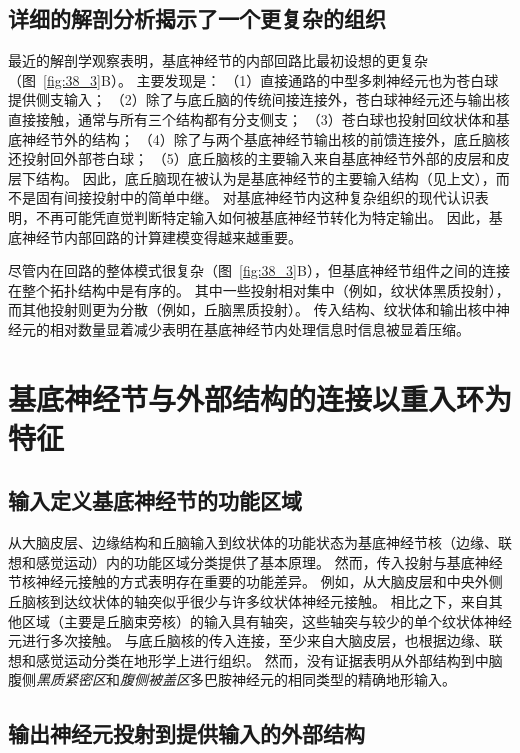 \subsection{详细的解剖分析揭示了一个更复杂的组织}

最近的解剖学观察表明，基底神经节的内部回路比最初设想的更复杂（图~\ref{fig:38_3}B）。
主要发现是：
（1）直接通路的中型多刺神经元也为苍白球提供侧支输入； 
（2）除了与底丘脑的传统间接连接外，苍白球神经元还与输出核直接接触，通常与所有三个结构都有分支侧支；
（3）苍白球也投射回纹状体和基底神经节外的结构；
（4）除了与两个基底神经节输出核的前馈连接外，底丘脑核还投射回外部苍白球； 
（5）底丘脑核的主要输入来自基底神经节外部的皮层和皮层下结构。
因此，底丘脑现在被认为是基底神经节的主要输入结构（见上文），而不是固有间接投射中的简单中继。
对基底神经节内这种复杂组织的现代认识表明，不再可能凭直觉判断特定输入如何被基底神经节转化为特定输出。
因此，基底神经节内部回路的计算建模变得越来越重要。


尽管内在回路的整体模式很复杂（图~\ref{fig:38_3}B），但基底神经节组件之间的连接在整个拓扑结构中是有序的。
其中一些投射相对集中（例如，纹状体黑质投射），而其他投射则更为分散（例如，丘脑黑质投射）。
传入结构、纹状体和输出核中神经元的相对数量显着减少表明在基底神经节内处理信息时信息被显着压缩。



\section{基底神经节与外部结构的连接以重入环为特征}

\subsection{输入定义基底神经节的功能区域}

从大脑皮层、边缘结构和丘脑输入到纹状体的功能状态为基底神经节核（边缘、联想和感觉运动）内的功能区域分类提供了基本原理。
然而，传入投射与基底神经节核神经元接触的方式表明存在重要的功能差异。
例如，从大脑皮层和中央外侧丘脑核到达纹状体的轴突似乎很少与许多纹状体神经元接触。
相比之下，来自其他区域（主要是丘脑束旁核）的输入具有轴突，这些轴突与较少的单个纹状体神经元进行多次接触。
与底丘脑核的传入连接，至少来自大脑皮层，也根据边缘、联想和感觉运动分类在地形学上进行组织。
然而，没有证据表明从外部结构到中脑腹侧\textit{黑质紧密区}和\textit{腹侧被盖区}多巴胺神经元的相同类型的精确地形输入。



\subsection{输出神经元投射到提供输入的外部结构}

